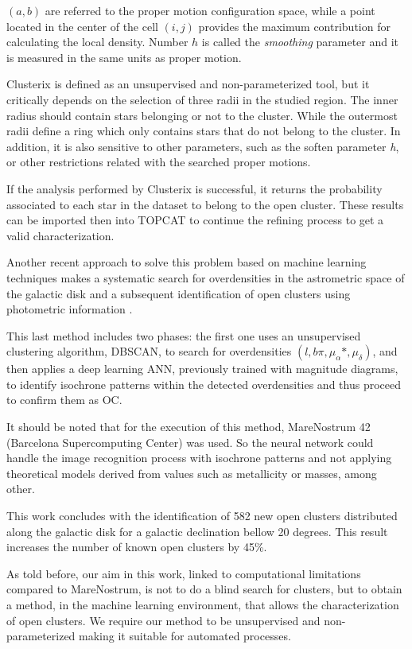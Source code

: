 \documentclass[11pt,a4paper,english,twocolumn]{article}
\begin{document}
$\left( a, b \right)$ are referred to the proper motion configuration space,
while a point located in the center of the cell $\left( i, j \right)$
provides the maximum contribution for calculating the local density.
Number $h$ is called the \emph{smoothing} parameter and it is measured
in the same units as proper motion.

Clusterix is defined as an unsupervised and non-parameterized tool, but it
critically depends on the selection of three radii in the studied region.
The inner radius should contain stars belonging or not to the cluster.
While the outermost radii define a ring which only contains stars that do
not belong to the cluster. In addition, it is also sensitive to other
parameters, such as the soften parameter \emph{h}, or other restrictions
related with the searched proper motions.

If the analysis performed by Clusterix is successful, it returns the probability
associated to each star in the dataset to belong to the open cluster.
These results can be imported then into TOPCAT to continue the refining process to
get a valid characterization.

Another recent approach to solve this problem based on machine learning techniques
makes a systematic search for overdensities in the astrometric space of the galactic
disk and a subsequent identification of open clusters using photometric information
\cite{castro2020hunting}.

This last method includes two phases: the first one uses an unsupervised clustering
algorithm, DBSCAN, to search for overdensities $(l, b \pi, \mu_{\alpha} *, \mu_{\delta})$,
and then applies a deep learning ANN, previously trained with magnitude diagrams,
to identify isochrone patterns within the detected overdensities and thus proceed
to confirm them as OC.

It should be noted that for the execution of this method, MareNostrum 42
(Barcelona Supercomputing Center) was used.
So the neural network could handle the image recognition process with
isochrone patterns and not applying theoretical models derived from
values such as metallicity or masses, among other.

This work concludes with the identification of 582 new open clusters
distributed along the galactic disk for a galactic declination bellow 20 degrees.
This result increases the number of known open clusters by 45\%.

As told before, our aim in this work, linked to computational limitations compared
to MareNostrum, is not to do a blind search for clusters, but to obtain a method,
in the machine learning environment, that allows the characterization of open clusters.
We require our method to be unsupervised and non-parameterized making it suitable for
automated processes.
\end{document}
